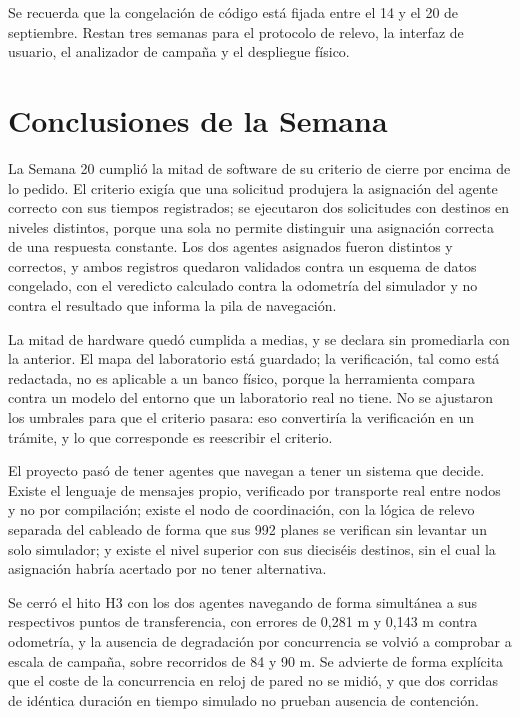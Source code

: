 \documentclass[12pt,letterpaper]{article}
\begin{document}
Se recuerda que la congelación de código está fijada entre el 14 y el 20 de septiembre. Restan tres semanas para el protocolo de relevo, la interfaz de usuario, el analizador de campaña y el despliegue físico.

\section{Conclusiones de la Semana}

La Semana 20 cumplió la mitad de software de su criterio de cierre por encima de lo pedido. El criterio exigía que una solicitud produjera la asignación del agente correcto con sus tiempos registrados; se ejecutaron dos solicitudes con destinos en niveles distintos, porque una sola no permite distinguir una asignación correcta de una respuesta constante. Los dos agentes asignados fueron distintos y correctos, y ambos registros quedaron validados contra un esquema de datos congelado, con el veredicto calculado contra la odometría del simulador y no contra el resultado que informa la pila de navegación.

La mitad de hardware quedó cumplida a medias, y se declara sin promediarla con la anterior. El mapa del laboratorio está guardado; la verificación, tal como está redactada, no es aplicable a un banco físico, porque la herramienta compara contra un modelo del entorno que un laboratorio real no tiene. No se ajustaron los umbrales para que el criterio pasara: eso convertiría la verificación en un trámite, y lo que corresponde es reescribir el criterio.

El proyecto pasó de tener agentes que navegan a tener un sistema que decide. Existe el lenguaje de mensajes propio, verificado por transporte real entre nodos y no por compilación; existe el nodo de coordinación, con la lógica de relevo separada del cableado de forma que sus 992 planes se verifican sin levantar un solo simulador; y existe el nivel superior con sus dieciséis destinos, sin el cual la asignación habría acertado por no tener alternativa.

Se cerró el hito H3 con los dos agentes navegando de forma simultánea a sus respectivos puntos de transferencia, con errores de 0,281 m y 0,143 m contra odometría, y la ausencia de degradación por concurrencia se volvió a comprobar a escala de campaña, sobre recorridos de 84 y 90 m. Se advierte de forma explícita que el coste de la concurrencia en reloj de pared no se midió, y que dos corridas de idéntica duración en tiempo simulado no prueban ausencia de contención.
\end{document}

